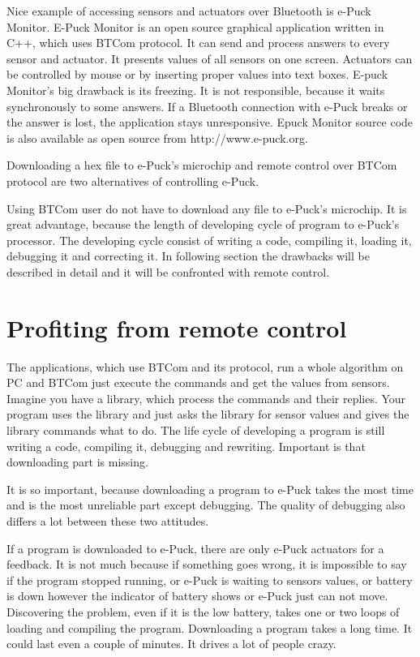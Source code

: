 	Nice example of accessing sensors and actuators over Bluetooth is e-Puck Monitor\cite{monitor}. 
	E-Puck Monitor is an open source graphical application written in C++, which uses BTCom protocol. 
	It can send and process answers to every sensor and actuator.
	It presents values of all sensors on one screen. Actuators can be controlled by mouse or by inserting
	proper values into text boxes.
	E-puck Monitor's big drawback is its freezing. It is not responsible, because it waits synchronously to some answers.
	If a Bluetooth connection with e-Puck breaks or the answer is lost, the application stays unresponsive.
	Epuck Monitor source code is also available as open source from  http://www.e-puck.org. %
	 
	Downloading a hex file to e-Puck's microchip and remote control over BTCom protocol are two alternatives
	of controlling e-Puck.
	 
	Using BTCom user do not have to download any file to e-Puck's microchip.
	It is great advantage, because the length of developing cycle of program to e-Puck's processor.
	The developing cycle consist of	writing a code, compiling it, loading it, debugging it and correcting it.
	In following section the drawbacks will be described in detail and it will be confronted with
	remote control.
\section{Profiting from remote control} \label{sec:remote}
	The applications, which use BTCom and its protocol, run a whole algorithm on PC and BTCom just 
	execute the commands and get the values from sensors. Imagine you have a library, which process the commands
	and their replies. Your program uses the library and just asks the library for sensor values and
	gives the library commands what to do. The life cycle of developing a program is still writing a code, compiling it, debugging and rewriting. Important is that downloading part is missing.
	 
	It is so important, because downloading a program to e-Puck takes the most time and is the most unreliable part except debugging.
	The quality of debugging also differs a lot between these two attitudes.
	 
	If a program is downloaded to e-Puck, there are only e-Puck actuators for a feedback.
	It is not much because if something goes wrong, it is impossible to say if the program stopped running,
	or e-Puck is waiting to sensors values, or battery is down however the indicator of battery shows or e-Puck just can not move.
	Discovering the problem, even if it is the low battery, takes one or two loops of loading and compiling the program.
	Downloading a program takes a long time. It could last even a couple of minutes. It drives a lot of people crazy.
	 

